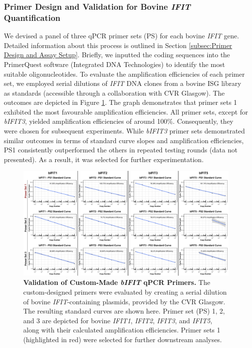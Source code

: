 \subsubsection{Primer Design and Validation for Bovine \textit{IFIT} Quantification} \label{Primer Design and Validation for Bovine IFIT Quantification}
We devised a panel of three qPCR primer sets (PS) for each bovine \textit{IFIT} gene. Detailed information about this process is outlined in Section \ref{subsec:Primer Design and Assay Setup}. Briefly, we inputted the coding sequences into the PrimerQuest software (Integrated DNA Technologies) to identify the most suitable oligonucleotides. To evaluate the amplification efficiencies of each primer set, we employed serial dilutions of \textit{IFIT} DNA clones from a bovine ISG library as standards (accessible through a collaboration with CVR Glasgow). The outcomes are depicted in Figure \ref{fig:Validation of custom-made bIFIT qPCR primers}. The graph demonstrates that primer sets 1 exhibited the most favourable amplification efficiencies. All primer sets, except for \textit{bIFIT3}, yielded amplification efficiencies of around 100\%. Consequently, they were chosen for subsequent experiments. While \textit{bIFIT3} primer sets demonstrated similar outcomes in terms of standard curve slopes and amplification efficiencies, PS1 consistently outperformed the others in repeated testing rounds (data not presented). As a result, it was selected for further experimentation.

\begin{figure}
    \centering
    \includegraphics[width=1\linewidth]{07. Chapter 2/Figs/01. Technologies/02. primer validation.pdf}
    \caption[Validation of Custom-Made \textit{bIFIT} qPCR Primers.]{\textbf{Validation of Custom-Made \textit{bIFIT} qPCR Primers.} The custom-designed primers were evaluated by creating a serial dilution of bovine \textit{IFIT}-containing plasmids, provided by the CVR Glasgow. The resulting standard curves are shown here. Primer set (PS) 1, 2, and 3 are depicted for bovine \textit{IFIT1}, \textit{IFIT2}, \textit{IFIT3}, and \textit{IFIT5}, along with their calculated amplification efficiencies. Primer sets 1 (highlighted in red) were selected for further downstream analyses.}
    \label{fig:Validation of custom-made bIFIT qPCR primers}
\end{figure}

